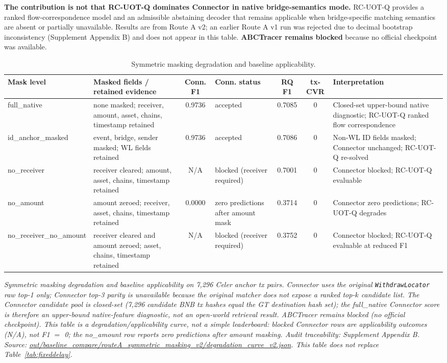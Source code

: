 \textbf{The contribution is not that RC-UOT-Q dominates Connector in native bridge-semantics mode.} RC-UOT-Q provides a ranked flow-correspondence model and an admissible abstaining decoder that remains applicable when bridge-specific matching semantics are absent or partially unavailable. Results are from Route A v2; an earlier Route A v1 run was rejected due to decimal bootstrap inconsistency (Supplement Appendix B) and does not appear in this table. \textbf{ABCTracer remains blocked} because no official checkpoint was available.

\begin{table}[!t]
\caption{Symmetric masking degradation and baseline applicability.}
\label{tab:masking}
\centering
\footnotesize
\setlength{\tabcolsep}{2.5pt}
\begin{tabular}{p{}p{}cp{}ccp{}}
\toprule
Mask level & Masked fields / retained evidence & Conn. F1 & Conn. status & RQ F1 & tx-CVR & Interpretation \\
\midrule
full\_native & none masked; receiver, amount, asset, chains, timestamp retained & 0.9736 & accepted & 0.7085 & 0 & Closed-set upper-bound native diagnostic; RC-UOT-Q ranked flow correspondence \\
id\_anchor\_masked & event, bridge, sender masked; WL fields retained & 0.9736 & accepted & 0.7086 & 0 & Non-WL ID fields masked; Connector unchanged; RC-UOT-Q re-solved \\
no\_receiver & receiver cleared; amount, asset, chains, timestamp retained & N/A & blocked (receiver required) & 0.7001 & 0 & Connector blocked; RC-UOT-Q evaluable \\
no\_amount & amount zeroed; receiver, asset, chains, timestamp retained & 0.0000 & zero predictions after amount mask & 0.3714 & 0 & Connector zero predictions; RC-UOT-Q degrades \\
no\_receiver\_no\_amount & receiver cleared and amount zeroed; asset, chains, timestamp retained & N/A & blocked (receiver required) & 0.3752 & 0 & Connector blocked; RC-UOT-Q evaluable at reduced F1 \\
\bottomrule
\end{tabular}
\end{table}

\emph{Symmetric masking degradation and baseline applicability on 7{,}296 Celer anchor tx pairs. Connector uses the original \texttt{WithdrawLocator} raw top-1 only; Connector top-3 parity is unavailable because the original matcher does not expose a ranked top-$k$ candidate list. The Connector candidate pool is closed-set (7{,}296 candidate BNB tx hashes equal the GT destination hash set); the full\_native Connector score is therefore an upper-bound native-feature diagnostic, not an open-world retrieval result. ABCTracer remains blocked (no official checkpoint). This table is a degradation/applicability curve, not a simple leaderboard: blocked Connector rows are applicability outcomes (N/A), not F1 $=$ 0; the no\_amount row reports zero predictions after amount masking. Audit traceability: Supplement Appendix B. Source: \url{out/baseline_compare/routeA_symmetric_masking_v2/degradation_curve_v2.json}. This table does not replace Table~\ref{tab:fixeddelay}.}

